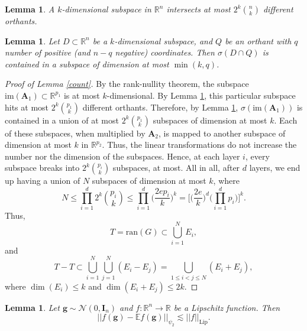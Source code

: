 \documentclass{article}
\newtheorem{lemma}[theorem]{Lemma}
\begin{document}
\begin{lemma}\label{quadrant}
A $k$-dimensional subspace in $\mathbb{R}^n$ intersects at most $2^k {n \choose k}$ different orthants.
\end{lemma}

\begin{lemma}\label{min}
Let $D \subset \mathbb{R}^n$ be a $k$-dimensional subspace, and $Q$ be an orthant with $q$ number of positive (and $n-q$ negative) coordinates. Then $\sigma(D \cap Q)$ is contained in a subspace of dimension at most $\min(k,q)$.
\end{lemma}


\begin{proof}[Proof of Lemma \ref{count}]
By the rank-nullity theorem, the subspace $\mathrm{im}(\mathbf{A}_1) \subset \mathbb{R}^{p_1}$ is at most $k$-dimensional. By Lemma \ref{quadrant}, this particular subspace hits at most $2^k {p_1 \choose k}$ different orthants. Therefore, by Lemma \ref{min}, $\sigma(\mathrm{im}(\mathbf{A}_1))$ is contained in a union of at most $2^k {p_1 \choose k}$ subspaces of dimension at most $k$. Each of these subspaces, when multiplied by $\mathbf{A}_2$, is mapped to another subspace of dimension at most $k$ in $\mathbb{R}^{p_2}$. Thus, the linear transformations do not increase the number nor the dimension of the subspaces. Hence, at each layer $i$, every subspace breaks into $2^k {p_i \choose k}$ subspaces, at most. All in all, after $d$ layers, we end up having a union of $N$ subspaces of dimension at most $k$, where
\begin{equation}
N \leq \prod_{i=1}^{d} 2^k {p_i \choose k} \leq \prod_{i=1}^{d} \Big(\frac{2ep_i}{k}\Big)^k = \Big[\big(\frac{2e}{k}\big)^{d}\Big(\prod_{i=1}^{d}p_i\Big)\Big]^k.
\end{equation}
Thus,
\begin{equation}
    T = \mathrm{ran}(G) \subset \bigcup_{i=1}^{N} E_i,
\end{equation}
and
\begin{equation}
    T-T \subset \bigcup_{i=1}^{N} \bigcup_{j=1}^{N} (E_i - E_j) = \bigcup_{1 \leq i<j \leq N} (E_i + E_j),
\end{equation}
where $\dim(E_i) \leq k$ and $\dim(E_i + E_j) \leq 2k$.
\end{proof}

\begin{lemma} \label{concentration}
Let $\mathbf{g} \sim \mathcal{N}(0, \mathbf{I}_n)$ and $f: \mathbb{R}^n \rightarrow \mathbb{R}$ be a Lipschitz function. Then
\begin{equation}
    ||f(\mathbf{g}) - \mathbb{E} f(\mathbf{g})||_{\psi_2} \lesssim ||f||_{\mathrm{Lip}}.
\end{equation}
\end{lemma}
\end{document}
